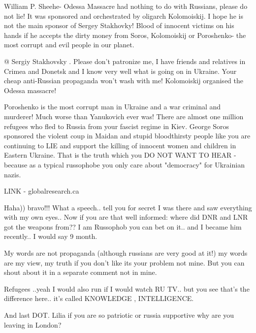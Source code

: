 \begin{itemize}
\begin{itemize}

William P. Sheehe- Odessa Massacre had nothing to do with Russians, please do
not lie! It was sponsored and orchestrated by oligarch Kolomoiskij. I hope he
is not the main sponsor of Sergey Stakhovky! Blood of innocent victims on his
hands if he accepts the dirty money from Soros, Kolomoiskij or Poroshenko- the
most corrupt and evil people in our planet.


@ Sergiy Stakhovsky . Please don't patronize me, I have friends and relatives
in Crimea and Donetsk and I know very well what is going on in Ukraine. Your
cheap anti-Russian propaganda won't wash with me! Kolomoiskij organised the
Odessa massacre!

Poroshenko is the most corrupt man in Ukraine and a war criminal and murderer!
Much worse than Yanukovich ever was! There are almost one million refugees who
fled to Russia from your fascist regime in Kiev. George Soros sponsored the
violent coup in Maidan and stupid bloodthirsty people like you are continuing
to LIE and support the killing of innocent women and children in Eastern
Ukraine. That is the truth which you DO NOT WANT TO HEAR - because as a typical
russophobe you only care about "democracy" for Ukrainian nazis.

LINK - globalresearch.ca


Haha)) bravo!!! What a speech.. tell you for secret I was there and saw
everything with my own eyes.. Now if you are that well informed: where did DNR
and LNR got the weapons from?? I am Russophob you can bet on it.. and I became
him recently.. I would say 9 month.


My words are not propaganda (although russians are very good at it!) my words
are my view, my truth if you don't like its your problem not mine. But you can
shout about it in a separate comment not in mine.


Refugees ..yeah I would also run if I would watch RU TV.. but you see that's
the difference here.. it's called KNOWLEDGE , INTELLIGENCE.


And last DOT. Lilia if you are so patriotic or russia supportive why are you
leaving in London?



\end{itemize}
\end{itemize}
